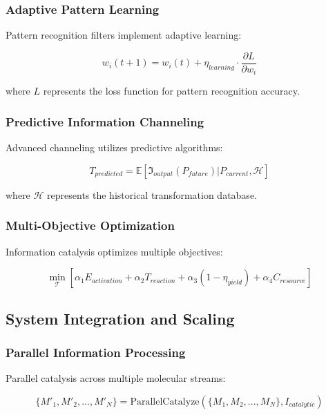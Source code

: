 \subsubsection{Adaptive Pattern Learning}

Pattern recognition filters implement adaptive learning:

\begin{equation}
w_i(t+1) = w_i(t) + \eta_{learning} \cdot \frac{\partial L}{\partial w_i}
\end{equation}

where $L$ represents the loss function for pattern recognition accuracy.

\subsubsection{Predictive Information Channeling}

Advanced channeling utilizes predictive algorithms:

\begin{equation}
T_{predicted} = \mathbb{E}[\mathfrak{I}_{output}(P_{future}) | P_{current}, \mathcal{H}]
\end{equation}

where $\mathcal{H}$ represents the historical transformation database.

\subsubsection{Multi-Objective Optimization}

Information catalysis optimizes multiple objectives:

\begin{equation}
\min_{\mathcal{T}} \left[ \alpha_1 E_{activation} + \alpha_2 T_{reaction} + \alpha_3 (1 - \eta_{yield}) + \alpha_4 C_{resource} \right]
\end{equation}

\subsection{System Integration and Scaling}

\subsubsection{Parallel Information Processing}

Parallel catalysis across multiple molecular streams:

\begin{equation}
\{M'_1, M'_2, ..., M'_N\} = \text{ParallelCatalyze}(\{M_1, M_2, ..., M_N\}, I_{catalytic})
\end{equation}

